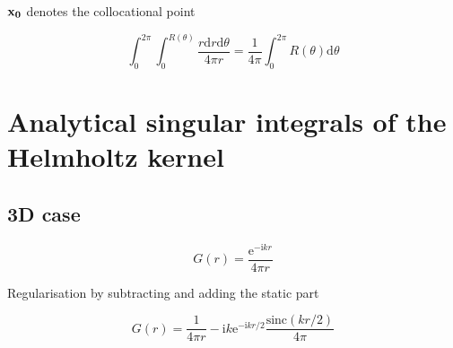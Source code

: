 \documentclass[a4paper,10pt,twocolumn]{article}
\newcommand{\td}{\mathrm{d}}
\newcommand{\te}{\mathrm{e}}
\newcommand{\ti}{\mathrm{i}}
\newcommand{\sinc}{\mathrm{sinc}}
\begin{document}
$\bf x_0$ denotes the collocational point

\begin{equation}
\int_0^{2\pi} \int_0^{R(\theta)} \frac{r \td r \td \theta}{4\pi r}
=
\frac{1}{4\pi}\int_0^{2\pi} R(\theta) \td \theta
\end{equation}


\section{Analytical singular integrals of the Helmholtz kernel}

\subsection{3D case}

\begin{equation}
G(r) = \frac{\te^{-\ti k r}}{4\pi r}
\end{equation}

Regularisation by subtracting and adding the static part

\begin{equation}
G(r) = \frac{1}{4\pi r} -\ti k \te^{-\ti k r/2} \frac{\sinc(k r/2)}{4\pi}
\end{equation}
\end{document}
